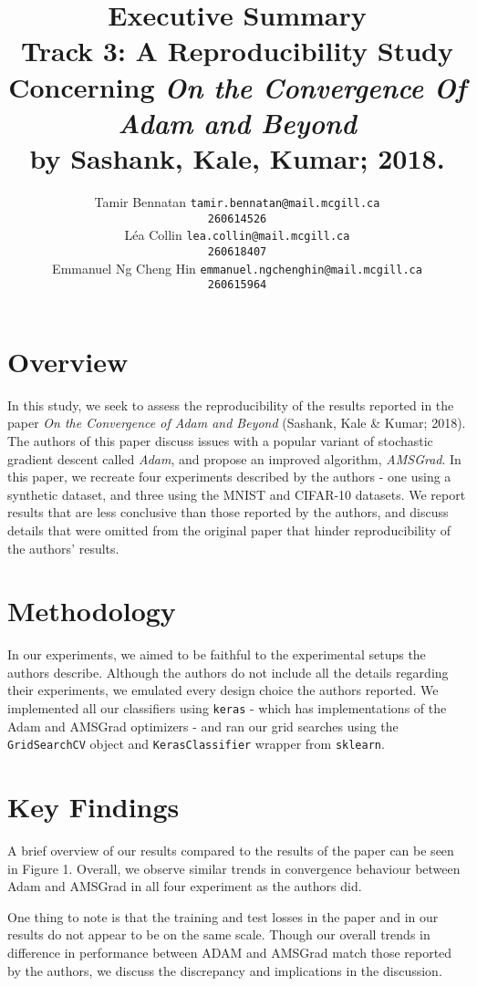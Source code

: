 \documentclass[letterpaper, 10 pt, conference]{ieeeconf}  %
\title{
Executive Summary \\
\large Track 3: A Reproducibility Study Concerning \emph{On the Convergence Of Adam and Beyond} \\
by Sashank, Kale, Kumar; 2018.
}
\author{ 
	\parbox{2 in}{\centering Tamir Bennatan
         {\tt\small tamir.bennatan@mail.mcgill.ca\\}
         {\tt\small 260614526}}
         \hspace*{ 0.3 in}
         \parbox{2 in}{\centering L\'ea Collin
         {\tt\small lea.collin@mail.mcgill.ca\\}
         {\tt\small 260618407}}
         \hspace*{0.3 in}
         \parbox{2 in}{\centering Emmanuel Ng Cheng Hin
         {\tt\small emmanuel.ngchenghin@mail.mcgill.ca\\}
         {\tt\small 260615964}}
}
\newcommand{\code}[1]{\colorbox{light-gray}{\texttt{#1}}}
\begin{document}
\maketitle
\thispagestyle{empty}
\pagestyle{empty}


\section{Overview}

In this study, we seek to assess the reproducibility of the results reported in the paper \emph{On the Convergence of Adam and Beyond} (Sashank, Kale \& Kumar; 2018). The authors of this paper discuss issues with a popular variant of stochastic gradient descent called \emph{Adam}, and propose an improved algorithm, \emph{AMSGrad}. In this paper, we recreate four experiments described by the authors - one using a synthetic dataset, and three using the MNIST and CIFAR-10 datasets. We report results that are less conclusive than those reported by the authors, and discuss details that were omitted from the original paper that hinder reproducibility of the authors' results.

\section{Methodology}

In our experiments, we aimed to be faithful to the experimental setups the authors describe. Although the authors do not include all the details regarding their experiments, we emulated every design choice the authors reported. We implemented all our classifiers using \texttt{keras} - which has implementations of the Adam and AMSGrad optimizers - and ran our grid searches using the \code{GridSearchCV} object and \code{KerasClassifier} wrapper from \texttt{sklearn}.

\section{Key Findings}

A brief overview of our results compared to the results of the paper can be seen in Figure 1. Overall, we observe similar trends in convergence behaviour between Adam and AMSGrad in all four experiment as the authors did. 

One thing to note is that the training and test losses in the paper and in our results do not appear to be on the same scale. Though our overall trends in difference in performance between ADAM and AMSGrad match those reported by the authors, we discuss the discrepancy and implications in the discussion. 
\end{document}
